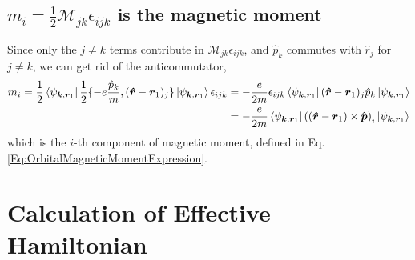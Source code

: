 \documentclass{report}
\renewcommand\vec[1]{\ensuremath\boldsymbol{#1}} %
\begin{document}
\section{$m_i = \frac{1}{2} \mathcal{M}_{jk}  \epsilon_{ijk}$ is the magnetic moment}
Since only the $j\neq k$ terms contribute in $\mathcal{M}_{jk} \epsilon_{ijk}$, and $\hat{p}_k$ commutes with $\hat{r}_j$ for $j\neq k$, we can get rid of the anticommutator,
$$
\begin{aligned}
	m_i = \frac{1}{2}\bra{\psi_{\vec{k},\vec{r}_1}} \frac{1}{2}\{-e\frac{\hat{p}_k}{m}, (\vec{\hat{r}} - \vec{r}_1)_j\} \ket{\psi_{\vec{k},\vec{r}_1}} \epsilon_{ijk} & = -\frac{e}{2m} \epsilon_{ijk} \bra{\psi_{\vec{k},\vec{r}_1}}(\vec{\hat{r}} - \vec{r}_1)_j \hat{p}_k  \ket{\psi_{\vec{k},\vec{r}_1}} \\
	& = -\frac{e}{2m}  \bra{\psi_{\vec{k},\vec{r}_1}}\left((\vec{\hat{r}} - \vec{r}_1) \times \hat{\vec{p}}\right)_i \ket{\psi_{\vec{k},\vec{r}_1}}
\end{aligned}
$$
which is the $i$-th component of magnetic moment, defined in Eq. \eqref{Eq:OrbitalMagneticMomentExpression}.

\chapter{Calculation of Effective Hamiltonian}\label{app:EffHamiltonian}

\printbibliography
\end{document}
